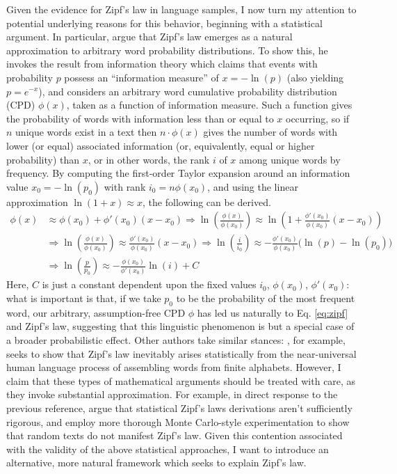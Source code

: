 \documentclass[10pt]{article}
\begin{document}
\begin{flushleft}
    \hspace*{0.5in} Given the evidence for Zipf's law in language samples, I now turn my attention to potential underlying reasons for this behavior, beginning with a statistical argument. In particular, \textcite{taylor_zipf} argue that Zipf's law emerges as a natural approximation to arbitrary word probability distributions. To show this, he invokes the result from information theory which claims that events with probability $p$ possess an ``information measure'' of $x = -\ln(p)$ (also yielding $p = e^{-x}$), and considers an arbitrary word cumulative probability distribution (CPD) $\phi(x)$, taken as a function of information measure. Such a function gives the probability of words with information less than or equal to $x$ occurring, so if $n$ unique words exist in a text then $n \cdot \phi(x)$ gives the number of words with lower (or equal) associated information (or, equivalently, equal or higher probability) than $x$, or in other words, the rank $i$ of $x$ among unique words by frequency. By computing the first-order Taylor expansion around an information value $x_0 = -\ln(p_0)$ with rank $i_0 = n\phi(x_0)$, and using the linear approximation $\ln(1 + x) \approx x$, the following can be derived.
    \begin{align*}
        \phi(x) &\approx \phi(x_0) + \phi'(x_0)(x - x_0) \Longrightarrow \ln\left(\frac{\phi(x)}{\phi(x_0)}\right) \approx \ln\left(1 + \frac{\phi'(x_0)}{\phi(x_0)}(x - x_0)\right)\\
        &\Longrightarrow \ln\left(\frac{\phi(x)}{\phi(x_0)}\right) \approx \frac{\phi'(x_0)}{\phi(x_0)}(x - x_0) \Longrightarrow \ln\left(\frac{i}{i_0}\right) \approx -\frac{\phi'(x_0)}{\phi(x_0)}\Big(\ln(p) - \ln(p_0)\Big)\\
        &\Longrightarrow \ln\left(\frac{p}{p_0}\right) \approx -\frac{\phi(x_0)}{\phi'(x_0)}\ln(i) + C
    \end{align*}
    Here, $C$ is just a constant dependent upon the fixed values $i_0$, $\phi(x_0)$, $\phi'(x_0)$: what is important is that, if we take $p_0$ to be the probability of the most frequent word, our arbitrary, assumption-free CPD $\phi$ has led us naturally to Eq. \ref{eq:zipf} and Zipf's law, suggesting that this linguistic phenomenon is but a special case of a broader probabilistic effect. Other authors take similar stances: \textcite{random_words_zipf}, for example, seeks to show that Zipf's law inevitably arises statistically from the near-universal human language process of assembling words from finite alphabets. However, I claim that these types of mathematical arguments should be treated with care, as they invoke substantial approximation. For example, in direct response to the previous reference, \textcite{not_random_words_zipf} argue that statistical Zipf's laws derivations aren't sufficiently rigorous, and employ more thorough Monte Carlo-style experimentation to show that random texts do not manifest Zipf's law. Given this contention associated with the validity of the above statistical approaches, I want to introduce an alternative, more natural framework which seeks to explain Zipf's law.
    

\end{flushleft}
\end{document}
